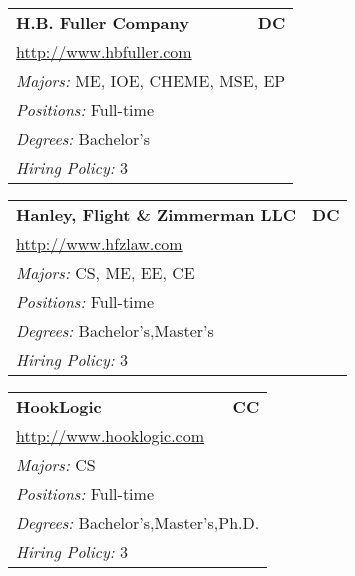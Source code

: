 \documentclass[twoside]{article}
\begin{document}
\begin{center}
\begin{multicols}{3}
\begin{FlushLeft}
\begin{minipage}{\columnwidth}
\end{minipage}
 
\begin{minipage}{\columnwidth}\begin{tabularx}{.95\columnwidth}{Xr}
                 {\Large\bf H.B. Fuller Company} & {\Large\bf DC}\\
    \multicolumn{2}{p{.95\columnwidth}}{\url{http://www.hbfuller.com}}\\
    \multicolumn{2}{p{.95\columnwidth}}{\emph{Majors:} ME, IOE, CHEME, MSE, EP}\\
    \multicolumn{2}{p{.95\columnwidth}}{\emph{Positions:} Full-time}\\
    \multicolumn{2}{p{.95\columnwidth}}{\emph{Degrees:} Bachelor's}\\
    \multicolumn{2}{p{.95\columnwidth}}{\emph{Hiring Policy:} 3}\\
    \end{tabularx}
    
\end{minipage}
 
\begin{minipage}{\columnwidth}\begin{tabularx}{.95\columnwidth}{Xr}
                 {\Large\bf Hanley, Flight \& Zimmerman LLC} & {\Large\bf DC}\\
    \multicolumn{2}{p{.95\columnwidth}}{\url{http://www.hfzlaw.com}}\\
    \multicolumn{2}{p{.95\columnwidth}}{\emph{Majors:} CS, ME, EE, CE}\\
    \multicolumn{2}{p{.95\columnwidth}}{\emph{Positions:} Full-time}\\
    \multicolumn{2}{p{.95\columnwidth}}{\emph{Degrees:} Bachelor's,Master's}\\
    \multicolumn{2}{p{.95\columnwidth}}{\emph{Hiring Policy:} 3}\\
    \end{tabularx}
    
\end{minipage}
 
\begin{minipage}{\columnwidth}\begin{tabularx}{.95\columnwidth}{Xr}
                 {\Large\bf HookLogic} & {\Large\bf CC}\\
    \multicolumn{2}{p{.95\columnwidth}}{\url{http://www.hooklogic.com}}\\
    \multicolumn{2}{p{.95\columnwidth}}{\emph{Majors:} CS}\\
    \multicolumn{2}{p{.95\columnwidth}}{\emph{Positions:} Full-time}\\
    \multicolumn{2}{p{.95\columnwidth}}{\emph{Degrees:} Bachelor's,Master's,Ph.D.}\\
    \multicolumn{2}{p{.95\columnwidth}}{\emph{Hiring Policy:} 3}\\
    \end{tabularx}
    

\end{minipage}
\end{FlushLeft}
\end{multicols}
\end{center}
\end{document}
